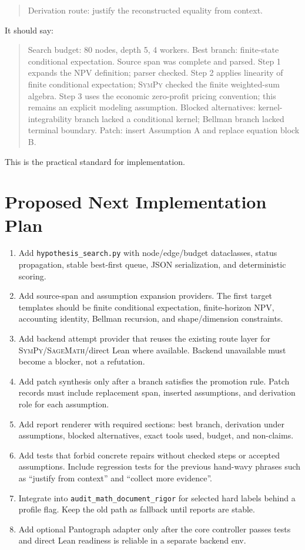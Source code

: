 \documentclass[11pt]{article}
\newcommand{\Sage}{\textsc{SageMath}}
\newcommand{\SymPy}{\textsc{SymPy}}
\begin{document}
\begin{quote}
Derivation route: justify the reconstructed equality from context.
\end{quote}

It should say:

\begin{quote}
Search budget: 80 nodes, depth 5, 4 workers. Best branch:
finite-state conditional expectation. Source span was complete and parsed.
Step 1 expands the NPV definition; parser checked. Step 2 applies linearity of
finite conditional expectation; \SymPy{} checked the finite weighted-sum
algebra. Step 3 uses the economic zero-profit pricing convention; this remains
an explicit modeling assumption. Blocked alternatives: kernel-integrability
branch lacked a conditional kernel; Bellman branch lacked terminal boundary.
Patch: insert Assumption A and replace equation block B.
\end{quote}

This is the practical standard for implementation.

\section{Proposed Next Implementation Plan}

\begin{enumerate}[leftmargin=*]
\item Add \texttt{hypothesis\_search.py} with node/edge/budget dataclasses,
  status propagation, stable best-first queue, JSON serialization, and
  deterministic scoring.
\item Add source-span and assumption expansion providers. The first target
  templates should be finite conditional expectation, finite-horizon NPV,
  accounting identity, Bellman recursion, and shape/dimension constraints.
\item Add backend attempt provider that reuses the existing route layer for
  \SymPy/\Sage/direct Lean where available. Backend unavailable must become a
  blocker, not a refutation.
\item Add patch synthesis only after a branch satisfies the promotion rule.
  Patch records must include replacement span, inserted assumptions, and
  derivation role for each assumption.
\item Add report renderer with required sections: best branch, derivation under
  assumptions, blocked alternatives, exact tools used, budget, and non-claims.
\item Add tests that forbid concrete repairs without checked steps or accepted
  assumptions. Include regression tests for the previous hand-wavy phrases such
  as ``justify from context'' and ``collect more evidence''.
\item Integrate into \texttt{audit\_math\_document\_rigor} for selected hard
  labels behind a profile flag. Keep the old path as fallback until reports are
  stable.
\item Add optional Pantograph adapter only after the core controller passes
  tests and direct Lean readiness is reliable in a separate backend env.
\end{enumerate}
\end{document}
